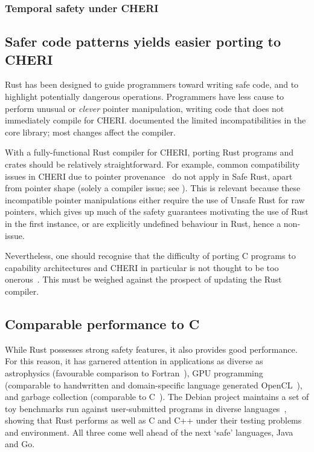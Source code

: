 \documentclass[dissertation.tex]{subfiles}
\begin{document}
\subsubsection{Temporal safety under CHERI}


\subsection{Safer code patterns yields easier porting to CHERI}
\label{sec:eval-cheri-port}

Rust has been designed to guide programmers toward writing safe code,
and to highlight potentially dangerous operations.
Programmers have less cause to perform unusual or \emph{clever} pointer
manipulation, writing code that does not immediately compile for CHERI.
 documented the limited incompatibilities in the
core library; most changes affect the compiler.

With a fully-functional Rust compiler for CHERI, porting Rust programs
and crates should be relatively straightforward.
For example, common compatibility issues in CHERI due to pointer
provenance~\cite{cheri-2019-abstract} do not apply in Safe Rust,
apart from pointer shape (solely a compiler issue; see
).
This is relevant because these incompatible pointer manipulations either
require the use of Unsafe Rust for raw pointers, which gives up much of
the safety guarantees motivating the use of Rust in the first instance,
or are explicitly undefined behaviour in Rust, hence a non-issue.

Nevertheless, one should recognise that the difficulty of porting C
programs to capability architectures and CHERI in particular is not
thought to be too onerous~\cite{capsicum-usability}.
This must be weighed against the prospect of updating the Rust compiler.


\subsection{Comparable performance to C}
\label{eval:cheri-perf}

While Rust possesses strong safety features, it also provides good
performance.
For this reason, it has garnered attention in applications as diverse as
astrophysics (favourable comparison to Fortran~\cite{blanco-astro}), GPU
programming (comparable to handwritten and domain-specific language
generated OpenCL~\cite{holk-gpu}), and garbage collection (comparable to
C~\cite{lin-gc}).
The Debian project maintains a set of toy benchmarks run against
user-submitted programs in diverse
languages~\cite{debian-benchmarksgame}, showing that Rust performs as
well as C and C++ under their testing problems and environment.
All three come well ahead of the next `safe' languages, Java and Go.
\end{document}
